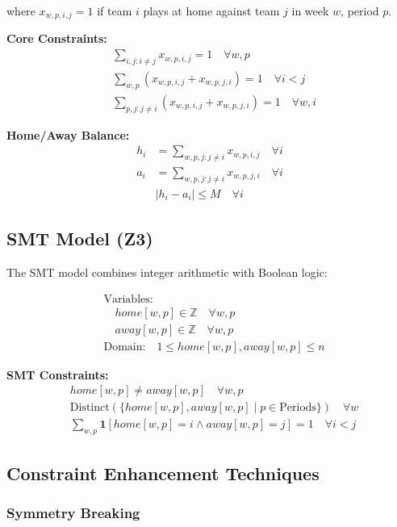 \documentclass[11pt]{article}
\begin{document}
where $x_{w,p,i,j} = 1$ if team $i$ plays at home against team $j$ in week $w$, period $p$.

\textbf{Core Constraints:}
\begin{align}
&\sum_{i,j: i \neq j} x_{w,p,i,j} = 1 \quad \forall w,p \\
&\sum_{w,p} (x_{w,p,i,j} + x_{w,p,j,i}) = 1 \quad \forall i < j \\
&\sum_{p,j: j \neq i} (x_{w,p,i,j} + x_{w,p,j,i}) = 1 \quad \forall w,i
\end{align}

\textbf{Home/Away Balance:}
\begin{align}
h_i &= \sum_{w,p,j: j \neq i} x_{w,p,i,j} \quad \forall i \\
a_i &= \sum_{w,p,j: j \neq i} x_{w,p,j,i} \quad \forall i \\
&|h_i - a_i| \leq M \quad \forall i
\end{align}

\subsection{SMT Model (Z3)}

The SMT model combines integer arithmetic with Boolean logic:

\begin{align}
&\text{Variables:} \\
&\quad home[w,p] \in \mathbb{Z} \quad \forall w,p \\
&\quad away[w,p] \in \mathbb{Z} \quad \forall w,p \\
&\text{Domain:} \quad 1 \leq home[w,p], away[w,p] \leq n
\end{align}

\textbf{SMT Constraints:}
\begin{align}
&home[w,p] \neq away[w,p] \quad \forall w,p \\
&\text{Distinct}(\{home[w,p], away[w,p] \mid p \in \text{Periods}\}) \quad \forall w \\
&\sum_{w,p} \mathbf{1}[home[w,p] = i \land away[w,p] = j] = 1 \quad \forall i < j
\end{align}

\subsection{Constraint Enhancement Techniques}

\subsubsection{Symmetry Breaking}
\end{document}
